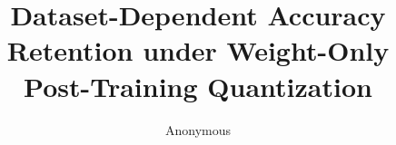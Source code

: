\documentclass[10pt,twocolumn,letterpaper]{article}
\title{Dataset-Dependent Accuracy Retention under Weight-Only\\Post-Training Quantization}
\author{Anonymous}
\begin{document}
\maketitle





{
    \small
    
    
}
\clearpage
\appendix

\end{document}
